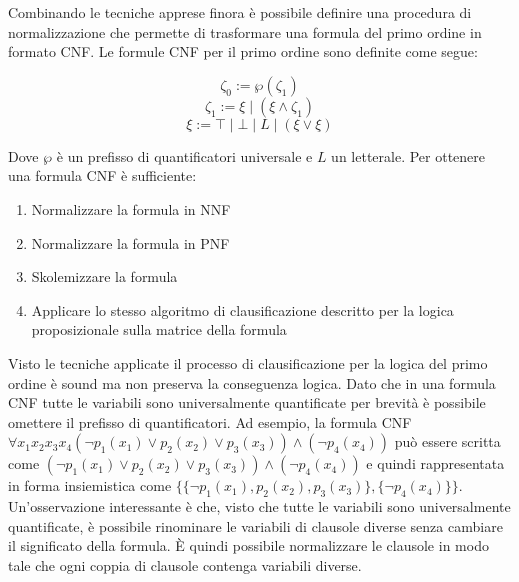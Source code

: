 \documentclass[./main.tex]{subfiles}
\begin{document}
Combinando le tecniche apprese finora è possibile definire una procedura di normalizzazione che permette di trasformare una formula del primo ordine
in formato CNF. Le formule CNF per il primo ordine sono definite come segue:

$$ \zeta_0 := \wp(\zeta_1) $$
$$ \zeta_1 := \xi \mid (\xi \land \zeta_1) $$
$$ \xi := \top \mid \bot \mid L \mid (\xi \lor \xi ) $$

Dove $\wp$ è un prefisso di quantificatori universale e $L$ un letterale. Per ottenere una formula CNF è sufficiente:

\begin{enumerate}
  \item Normalizzare la formula in NNF
  \item Normalizzare la formula in PNF
  \item Skolemizzare la formula
  \item Applicare lo stesso algoritmo di clausificazione descritto per la logica proposizionale sulla matrice della formula
\end{enumerate}

Visto le tecniche applicate il processo di clausificazione per la logica del primo ordine è sound ma non preserva la conseguenza logica.
Dato che in una formula CNF tutte le variabili sono universalmente quantificate per brevità è possibile omettere il prefisso di quantificatori.
Ad esempio, la formula CNF $\forall x_1 x_2 x_3 x_4 (\lnot p_1(x_1) \lor p_2(x_2) \lor p_3(x_3)) \land (\lnot p_4(x_4))$ può essere scritta come
$(\lnot p_1(x_1) \lor p_2(x_2) \lor p_3(x_3)) \land (\lnot p_4(x_4))$ e quindi rappresentata
in forma insiemistica come $\{\{\lnot p_1(x_1), p_2(x_2), p_3(x_3)\}, \{\lnot p_4(x_4)\}\}$.
Un'osservazione interessante è che, visto che tutte le variabili sono universalmente quantificate, è possibile rinominare le variabili di clausole diverse senza
cambiare il significato della formula. È quindi possibile normalizzare le clausole in modo tale che ogni coppia di clausole contenga variabili diverse.

\end{document}
